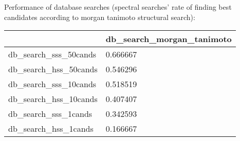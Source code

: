 Performance of database searches (spectral searches' rate of finding best candidates according to morgan tanimoto structural search):
\begin{tabular}{ll}
\toprule
 & db_search_morgan_tanimoto \\
\midrule
db_search_sss_50cands & 0.666667 \\
db_search_hss_50cands & 0.546296 \\
db_search_sss_10cands & 0.518519 \\
db_search_hss_10cands & 0.407407 \\
db_search_sss_1cands & 0.342593 \\
db_search_hss_1cands & 0.166667 \\
\bottomrule
\end{tabular}
